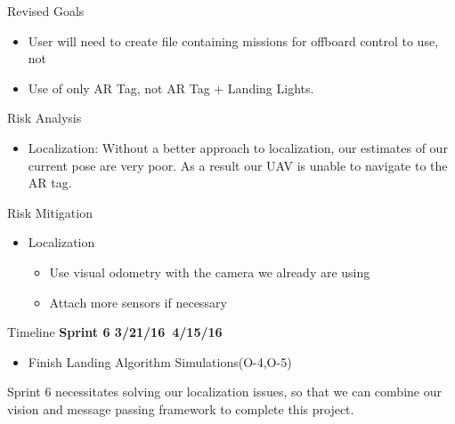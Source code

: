 \documentclass[11pt]{beamer}
\begin{document}
\begin{frame}{Revised Goals}
	\begin{itemize}
		\item User will need to create file containing missions for offboard control to use, not 
		\item Use of only AR Tag, not AR Tag + Landing Lights.
	\end{itemize}

\end{frame}



\begin{frame}{Risk Analysis}
\begin{itemize}
\item Localization: Without a better approach to localization, our estimates of our current pose are very poor. As a result our UAV is unable to navigate to the AR tag.
\end{itemize}


\end{frame}

\begin{frame}{Risk Mitigation}
\begin{itemize}
\item Localization
\begin{itemize}
\item Use visual odometry with the camera we already are using
\item Attach more sensors if necessary
\end{itemize}

\end{itemize}

\end{frame}


\begin{frame}{Timeline}
\textbf{Sprint 6 3/21/16~4/15/16}
\begin{itemize}
\item Finish Landing Algorithm Simulations(O-4,O-5)
\end{itemize}
\vspace{2mm}
Sprint 6 necessitates solving our localization issues, so that we can combine our vision and message passing framework to complete this project.
\end{frame}
\end{document}
